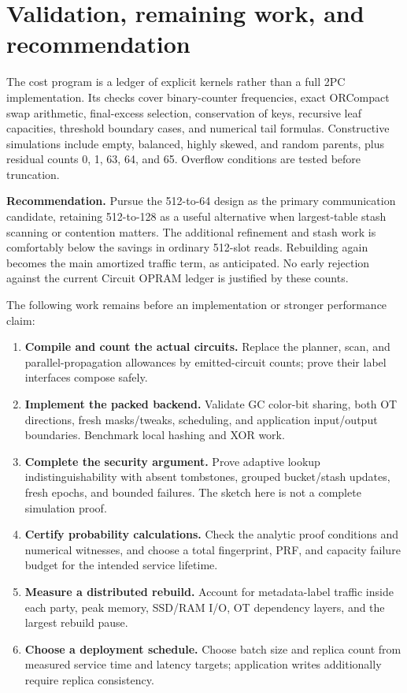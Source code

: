 \documentclass[11pt]{article}
\begin{document}
\section{Validation, remaining work, and recommendation}
The cost program is a ledger of explicit kernels rather than a full 2PC
implementation. Its checks cover binary-counter frequencies, exact
ORCompact swap arithmetic, final-excess selection, conservation of keys,
recursive leaf capacities, threshold boundary cases, and numerical tail
formulas. Constructive simulations include empty, balanced, highly skewed,
and random parents, plus residual counts 0, 1, 63, 64, and 65. Overflow
conditions are tested before truncation.

\textbf{Recommendation.} Pursue the 512-to-64 design as the primary
communication candidate, retaining 512-to-128 as a useful alternative
when largest-table stash scanning or contention matters. The additional
refinement and stash work is comfortably below the savings in ordinary
512-slot reads. Rebuilding again becomes the main amortized traffic term,
as anticipated. No early rejection against the current Circuit OPRAM
ledger is justified by these counts.

The following work remains before an implementation or stronger performance
claim:
\begin{enumerate}
\item \textbf{Compile and count the actual circuits.} Replace the planner,
      scan, and parallel-propagation allowances by emitted-circuit counts;
      prove their label interfaces compose safely.
\item \textbf{Implement the packed backend.} Validate GC color-bit sharing,
      both OT directions, fresh masks/tweaks, scheduling, and application
      input/output boundaries. Benchmark local hashing and XOR work.
\item \textbf{Complete the security argument.} Prove adaptive lookup
      indistinguishability with absent tombstones, grouped bucket/stash
      updates, fresh epochs, and bounded failures. The sketch here is not
      a complete simulation proof.
\item \textbf{Certify probability calculations.} Check the analytic proof
      conditions and numerical witnesses, and choose a total fingerprint,
      PRF, and capacity failure budget for the intended service lifetime.
\item \textbf{Measure a distributed rebuild.} Account for metadata-label
      traffic inside each party, peak memory, SSD/RAM I/O, OT dependency
      layers, and the largest rebuild pause.
\item \textbf{Choose a deployment schedule.} Choose batch size and replica
      count from measured service time and latency targets; application
      writes additionally require replica consistency.
\end{enumerate}
\end{document}
